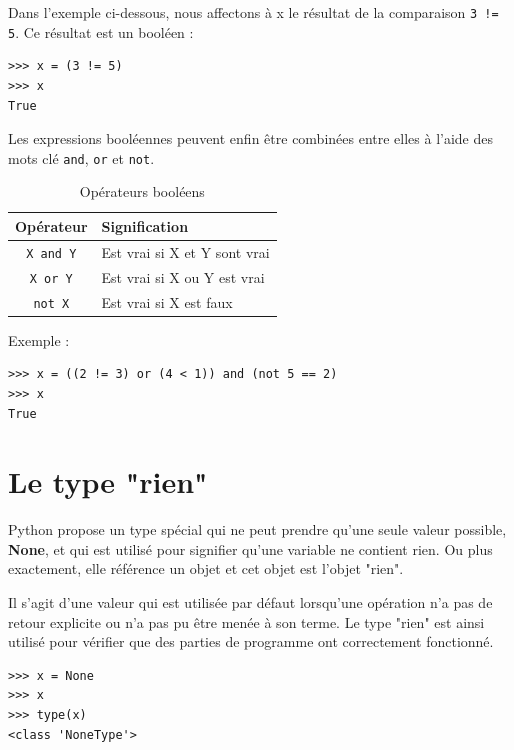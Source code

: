 \documentclass[12pt, a4paper]{article}
\begin{document}
Dans l'exemple ci-dessous, nous affectons à x le résultat de la comparaison \lstinline{3 != 5}. Ce résultat est un booléen :
\begin{lstlisting}
>>> x = (3 != 5)
>>> x
True
\end{lstlisting}

Les expressions booléennes peuvent enfin être combinées entre elles à l'aide des mots clé \lstinline{and}, \lstinline{or} et \lstinline{not}. 

\begin{table}[H]
	\begin{center}
		\begin{tabular}{|c|l|}
			\hline
			\textbf{Opérateur} & \textbf{Signification} \\
			\hline
			\lstinline{X and Y} & Est vrai si X et Y sont vrai \\
			\lstinline{X or Y} & Est vrai si X ou Y est vrai\\
			\lstinline{not X} & Est vrai si X est faux \\
			\hline
		\end{tabular}
	\caption{Opérateurs booléens}
	\label{tab:operateurs_booleens}
	\end{center}
\end{table}

Exemple :
\begin{lstlisting}
>>> x = ((2 != 3) or (4 < 1)) and (not 5 == 2)
>>> x
True
\end{lstlisting}



\section{Le type "rien"}
Python propose un type spécial qui ne peut prendre qu'une seule valeur possible, \textbf{None}, et qui est utilisé pour signifier qu'une variable ne contient rien. Ou plus exactement, elle référence un objet et cet objet est l'objet "rien". 

Il s'agit d'une valeur qui est utilisée par défaut lorsqu'une opération n'a pas de retour explicite ou n'a pas pu être menée à son terme. Le type "rien" est ainsi utilisé pour vérifier que des parties de programme ont correctement fonctionné.

\begin{lstlisting}
>>> x = None
>>> x
>>> type(x)
<class 'NoneType'>
\end{lstlisting}
\end{document}
